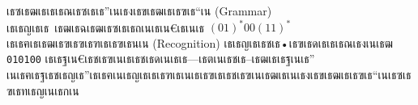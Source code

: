 ﻿%
\question เธซเธฒเธเธเธณเธซเธเธ”เนเธงเธขเธฒเธเธฃเธ“เน (Grammar) เธเธญเธเธ เธฒเธฉเธฒเธซเธเธถเนเธเน€เธเนเธ $(01)^*00(11)^*$ เธเธฅเธเธฒเธฃเธฃเธฑเธเธฃเธนเน (Recognition) เธเธญเธเธชเธ•เธฃเธดเธเธเธณเธงเนเธฒ \texttt{010100} เธเธฐเน€เธชเธฃเนเธเธชเธดเนเธเธ—เธตเนเธชเธ–เธฒเธเธฐเนเธ” เนเธฅเธฐเธชเธญเธ”เธเธฅเนเธญเธเธเธฑเธเนเธเธฃเธเธชเธฃเนเธฒเธเนเธงเธขเธฒเธเธฃเธ“เนเธซเธฃเธทเธญเนเธกเน
